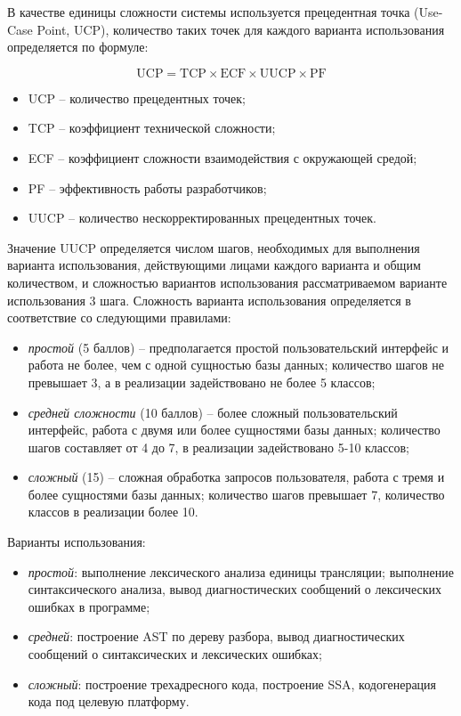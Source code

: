 \documentclass[14pt,russian]{extarticle}
\begin{document}
В качестве единицы сложности системы используется прецедентная точка (Use-Case
Point, UCP), количество таких точек для каждого варианта использования
определяется по формуле:

\begin{equation}
	\mathrm{UCP} = \mathrm{TCP} \times \mathrm{ECF} \times \mathrm{UUCP} \times \mathrm{PF}
\end{equation}

\begin{itemize}
	\item UCP – количество прецедентных точек;
	\item TCP – коэффициент технической сложности;
	\item ECF – коэффициент сложности взаимодействия с окружающей средой;
	\item PF – эффективность работы разработчиков;
	\item UUCP – количество нескорректированных прецедентных точек.
\end{itemize}

Значение UUCP определяется числом шагов, необходимых для выполнения варианта
использования, действующими лицами каждого варианта и общим количеством, и
сложностью вариантов использования рассматриваемом варианте использования 3
шага. Сложность варианта использования определяется в соответствие со следующими
правилами:

\begin{itemize}
	\item \textit{простой} (5 баллов) – предполагается простой пользовательский интерфейс
		и работа не более, чем с одной сущностью базы данных; количество шагов не
		превышает 3, а в реализации задействовано не более 5 классов;

	\item \textit{средней сложности} (10 баллов) – более сложный пользовательский
		интерфейс, работа с двумя или более сущностями базы данных; количество шагов
		составляет от 4 до 7, в реализации задействовано 5-10 классов;

	\item \textit{сложный} (15) – сложная обработка запросов пользователя, работа с тремя и
		более сущностями базы данных; количество шагов превышает 7, количество
		классов в реализации более 10.
\end{itemize}

Варианты использования:

\begin{itemize}
	\item \textit{простой}: выполнение лексического анализа единицы трансляции;
		выполнение синтаксического анализа, вывод диагностических сообщений о
		лексических ошибках в программе;

	\item \textit{средней}: построение AST по дереву разбора, вывод
		диагностических сообщений о синтаксических и лексических ошибках;

	\item \textit{сложный}: построение трехадресного кода, построение SSA, кодогенерация
		кода под целевую платформу.
\end{itemize}
\end{document}
